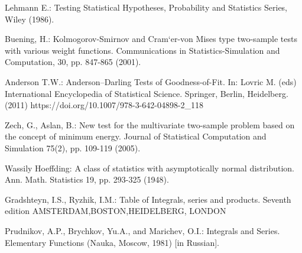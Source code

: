 \documentclass{svproc}
\begin{document}
\begin{thebibliography}{6}

Lehmann E.: Testing  Statistical  Hypotheses,  Probability  and  Statistics  Series,  Wiley (1986).

Buening, H.: Kolmogorov-Smirnov and Cram`er-von Mises type two-sample tests with various weight functions. Communications in Statistics-Simulation and Computation, 30, pp. 847-865 (2001).

Anderson T.W.:  Anderson–Darling Tests of Goodness-of-Fit. In: Lovric M. (eds) International Encyclopedia of Statistical Science. Springer, Berlin, Heidelberg.(2011) https://doi.org/10.1007/978-3-642-04898-2\_118

Zech, G., Aslan, B.: New test for the multivariate two-sample problem based on the concept of minimum energy. Journal of Statistical Computation and Simulation 75(2), pp. 109-119 (2005).


Wassily Hoeffding: A class of statistics with asymptotically normal distribution. Ann. Math. Statistics 19, pp. 293-325 (1948).

Gradshteyn, I.S., Ryzhik, I.M.: Table of Integrals, series and products. Seventh edition AMSTERDAM,BOSTON,HEIDELBERG, LONDON

Prudnikov, A.P., Brychkov, Yu.A., and Marichev, O.I.: Integrals and Series. Elementary Functions (Nauka, Moscow, 1981) [in Russian].

\end{thebibliography}
\end{document}
